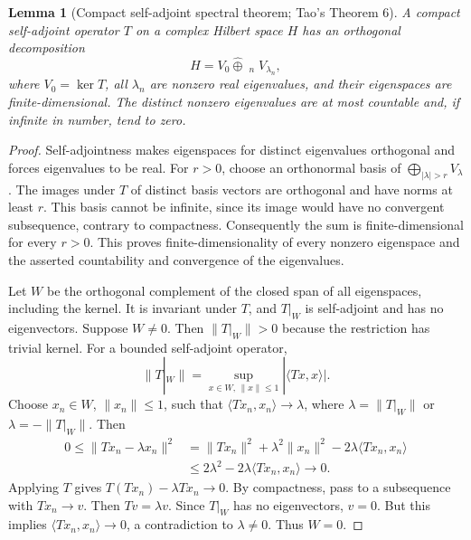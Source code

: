 \documentclass[UTF8,11pt]{ctexart}
\newtheorem*{lemma}{Lemma}
\theoremstyle{definition}
\begin{document}
\begin{lemma}[Compact self-adjoint spectral theorem; Tao's Theorem 6]
A compact self-adjoint operator $T$ on a complex Hilbert space $H$ has
an orthogonal decomposition
\[
 H=V_0\mathbin{\widehat\oplus}\mathop{\widehat\bigoplus}_{n}V_{\lambda_n},
\]
where $V_0=\ker T$, all $\lambda_n$ are nonzero real eigenvalues, and their
eigenspaces are finite-dimensional. The distinct nonzero eigenvalues are
at most countable and, if infinite in number, tend to zero.
\end{lemma}
\begin{proof}
Self-adjointness makes eigenspaces for distinct eigenvalues orthogonal and
forces eigenvalues to be real. For $r>0$, choose an orthonormal basis of
$\bigoplus_{|\lambda|>r}V_\lambda$. The images under $T$ of distinct basis
vectors are orthogonal and have norms at least $r$. This basis cannot be
infinite, since its image would have no convergent subsequence, contrary
to compactness. Consequently the sum is finite-dimensional for every
$r>0$. This proves finite-dimensionality of every nonzero eigenspace and
the asserted countability and convergence of the eigenvalues.

Let $W$ be the orthogonal complement of the closed span of all eigenspaces,
including the kernel. It is invariant under $T$, and $T|_W$ is self-adjoint
and has no eigenvectors. Suppose $W\ne0$. Then $\|T|_W\|>0$ because the
restriction has trivial kernel. For a bounded self-adjoint operator,
\[
 \|T|_W\|=\sup_{x\in W,\,\|x\|\leq1}|\langle Tx,x\rangle|.
\]
Choose $x_n\in W$, $\|x_n\|\leq1$, such that
$\langle Tx_n,x_n\rangle\to\lambda$, where
$\lambda=\|T|_W\|$ or $\lambda=-\|T|_W\|$. Then
\[
\begin{split}
 0\leq\|Tx_n-\lambda x_n\|^2
 &=\|Tx_n\|^2+\lambda^2\|x_n\|^2
       -2\lambda\langle Tx_n,x_n\rangle\\
 &\leq 2\lambda^2-2\lambda\langle Tx_n,x_n\rangle\longrightarrow0.
\end{split}
\]
Applying $T$ gives $T(Tx_n)-\lambda Tx_n\to0$. By compactness, pass to a
subsequence with $Tx_n\to v$. Then $Tv=\lambda v$. Since $T|_W$ has no
eigenvectors, $v=0$. But this implies
$\langle Tx_n,x_n\rangle\to0$, a contradiction to $\lambda\ne0$.
Thus $W=0$.
\end{proof}
\end{document}
